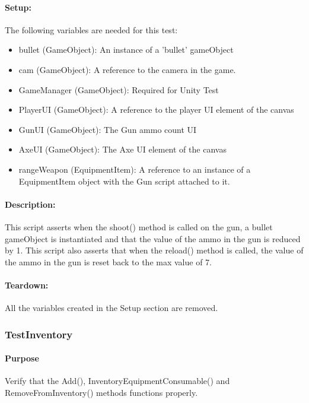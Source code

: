 \documentclass[12pt, titlepage]{article}
\begin{document}
\paragraph{Setup: } The following variables are needed for this test:
\begin{itemize}
	\item bullet (GameObject): An instance of a 'bullet' gameObject
	\item cam (GameObject): A reference to the camera in the game.
	\item GameManager (GameObject): Required for Unity Test
	\item  PlayerUI (GameObject): A reference to the player UI element of the canvas
	\item  GunUI (GameObject): The Gun ammo count UI
	\item AxeUI (GameObject): The Axe UI element of the canvas
	\item rangeWeapon (EquipmentItem): A reference to an instance of a EquipmentItem object with the Gun script attached to it.
	
\end{itemize}
\paragraph{Description: }
This script asserts when the shoot() method is called on the gun,  a bullet gameObject is instantiated and that the value of the ammo in the gun is reduced by 1. This script also asserts that when the reload() method is called, the value of the ammo in the gun is reset back to the max value of 7.

\paragraph{Teardown: } All the variables created in the Setup section are removed.

\subsubsection{Test\textunderscore Inventory}

\paragraph{Purpose} Verify that the Add(), InventoryEquipmentConsumable() and RemoveFromInventory() methods functions properly.
\end{document}
